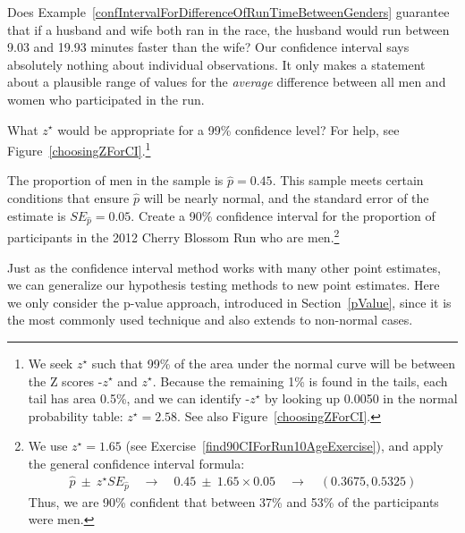 {\begin{example}{Does Example~\ref{confIntervalForDifferenceOfRunTimeBetweenGenders} guarantee that if a husband and wife both ran in the race, the husband would run between 9.03 and 19.93 minutes faster than the wife?}
Our confidence interval says absolutely nothing about individual observations. It {only} makes a statement about a plausible range of values for the \emph{average} difference between all men and women who participated in the run.
\end{example}

\begin{exercise} \label{findZFor99PercConfLevelInFrameworkForInf}
What $z^{\star}$ would be appropriate for a 99\% confidence level? For help, see Figure~\vref{choosingZForCI}.\footnote{We seek $z^{\star}$ such that 99\% of the area under the normal curve will be between the Z scores -$z^{\star}$ and $z^{\star}$. Because the remaining 1\% is found in the tails, each tail has area 0.5\%, and we can identify -$z^{\star}$ by looking up 0.0050 in the normal probability table: $z^{\star} = 2.58$. See also Figure~\vref{choosingZForCI}.}
\end{exercise}

\begin{exercise}
The proportion of men in the  sample is $\hat{p}=0.45$. This sample meets certain conditions that ensure $\hat{p}$ will be nearly normal, and the standard error of the estimate is $SE_{\hat{p}}=0.05$. Create a 90\% confidence interval for the proportion of participants in the 2012 Cherry Blossom Run who are men.\footnote{We use $z^{\star}=1.65$ (see Exercise~\vref{find90CIForRun10AgeExercise}), and apply the general confidence interval formula:
\begin{eqnarray*}
\hat{p}\ \pm\ z^{\star}SE_{\hat{p}}
	\quad\to\quad 0.45\ \pm\ 1.65\times 0.05
	\quad\to\quad (0.3675, 0.5325)
\end{eqnarray*}
Thus, we are 90\% confident that between 37\% and 53\% of the participants were men.}
\end{exercise}



Just as the confidence interval method works with many other point estimates, we can generalize our hypothesis testing methods to new point estimates. Here we only consider the p-value approach, introduced in Section~\ref{pValue}, since it is the most commonly used technique and also extends to non-normal cases.

}
